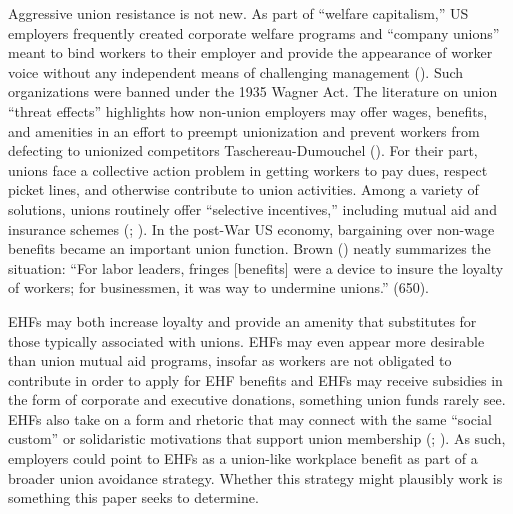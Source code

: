 \documentclass[
  11pt,
  oneside]{article}
\begin{document}
Aggressive union resistance is not new. As part of ``welfare capitalism,'' US employers frequently created corporate welfare programs and ``company unions'' meant to bind workers to their employer and provide the appearance of worker voice without any independent means of challenging management (). Such organizations were banned under the 1935 Wagner Act. The literature on union ``threat effects'' highlights how non-union employers may offer wages, benefits, and amenities in an effort to preempt unionization and prevent workers from defecting to unionized competitors Taschereau-Dumouchel (). For their part, unions face a collective action problem in getting workers to pay dues, respect picket lines, and otherwise contribute to union activities. Among a variety of solutions, unions routinely offer ``selective incentives,'' including mutual aid and insurance schemes (; ). In the post-War US economy, bargaining over non-wage benefits became an important union function. Brown () neatly summarizes the situation: ``For labor leaders, fringes {[}benefits{]} were a device to insure the loyalty of workers; for businessmen, it was way to undermine unions.'' (650).

EHFs may both increase loyalty and provide an amenity that substitutes for those typically associated with unions. EHFs may even appear more desirable than union mutual aid programs, insofar as workers are not obligated to contribute in order to apply for EHF benefits and EHFs may receive subsidies in the form of corporate and executive donations, something union funds rarely see. EHFs also take on a form and rhetoric that may connect with the same ``social custom'' or solidaristic motivations that support union membership (; ). As such, employers could point to EHFs as a union-like workplace benefit as part of a broader union avoidance strategy. Whether this strategy might plausibly work is something this paper seeks to determine.
\end{document}
